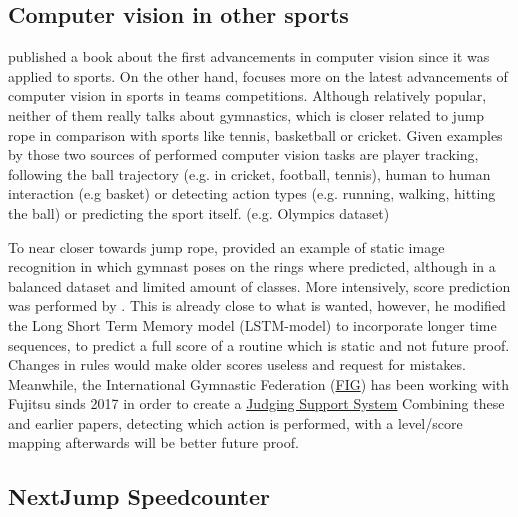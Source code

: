 \subsection{Computer vision in other sports}
\label{subsubsec:bp-literature-computer-vision-sports}

\textcite{Soomro_2014} published a book about the first advancements in computer vision since it was applied to sports. On the other hand, \textcite{Yin_2024} focuses more on the latest advancements of computer vision in sports in teams competitions. Although relatively popular, neither of them really talks about gymnastics, which is closer related to jump rope in comparison with sports like tennis, basketball or cricket.
Given examples by those two sources of performed computer vision tasks are player tracking, following the ball trajectory (e.g. in cricket, football, tennis), human to human interaction (e.g basket) or detecting action types (e.g. running, walking, hitting the ball) or predicting the sport itself. (e.g. Olympics dataset)

To near closer towards jump rope, \textcite{Abdullah_2023} provided an example of static image recognition in which gymnast poses on the rings where predicted, although in a balanced dataset and limited amount of classes. More intensively, score prediction was performed by \textcite{Zahan_2023}. This is already close to what is wanted, however, he modified the Long Short Term Memory model (LSTM-model) to incorporate longer time sequences, to predict a full score of a routine which is static and not future proof. Changes in rules would make older scores useless and request for mistakes.
Meanwhile, the International Gymnastic Federation (\href{https://www.gymnastics.sport/site/}{FIG}) has been working with Fujitsu sinds 2017 in order to create a \href{https://www.fujitsu.com/global/themes/data-driven/judging-support-system/}{Judging Support System}
Combining these and earlier papers, detecting which action is performed, with a level/score mapping afterwards will be better future proof.

\subsection{NextJump Speedcounter}
\label{subsubsec:bp-literature-nextjump-speedcounter}

